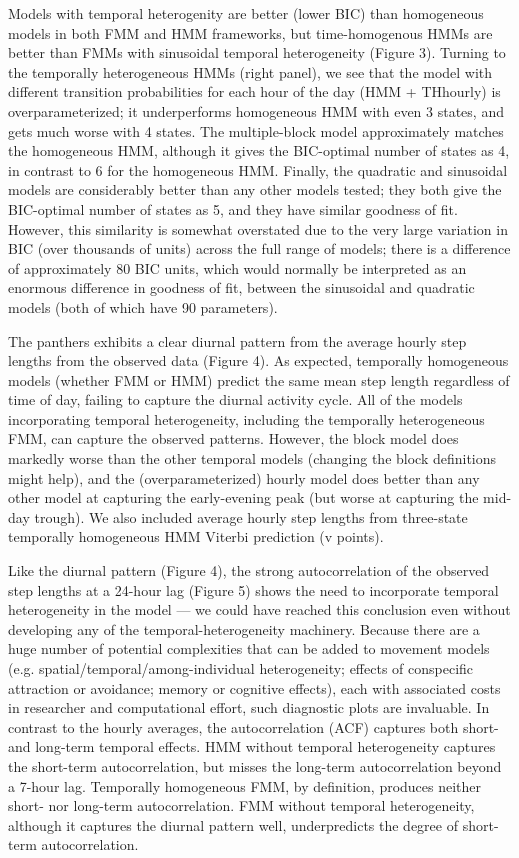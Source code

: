 \documentclass{bmcart}
\begin{document}

Models with temporal heterogenity are better (lower BIC) than homogeneous models in both FMM and HMM frameworks, but time-homogenous HMMs are better than FMMs with sinusoidal temporal heterogeneity (Figure 3). Turning to the temporally heterogeneous HMMs (right panel), we see that the model with different transition probabilities for each hour of the day (HMM + THhourly) is overparameterized; it underperforms homogeneous HMM with even 3 states, and gets much worse with 4 states. The multiple-block model approximately matches the homogeneous HMM, although it gives the BIC-optimal number of states as 4, in contrast to 6 for the homogeneous HMM.  Finally, the quadratic and sinusoidal models are considerably better than any other models tested; they both give the BIC-optimal number of states as 5, and they have similar goodness of fit.
However, this similarity is somewhat overstated due to the very large variation in BIC (over thousands of units) across the full range of models; there is a difference of approximately 80 BIC units, which would
normally be interpreted as an enormous difference in goodness of fit,
between the sinusoidal and quadratic models (both of which have 90 
parameters).



The panthers exhibits a clear diurnal pattern from the average hourly step lengths from the observed data (Figure 4). As expected, temporally homogeneous models (whether FMM or HMM) predict the same mean step length regardless of time of day, failing to capture the diurnal activity cycle. All of the models incorporating temporal heterogeneity, including the temporally heterogeneous FMM, can capture the observed patterns. However, the block model does markedly worse than the other temporal models (changing the block definitions might help), and the (overparameterized) hourly model does better than any other model at capturing the early-evening peak (but worse at capturing the mid-day trough). We also included average hourly step lengths from three-state temporally homogeneous HMM Viterbi prediction (v points).

Like the diurnal pattern (Figure 4),
the strong autocorrelation of the observed step lengths at a 24-hour lag (Figure 5) shows the need to incorporate temporal heterogeneity in the model --- we could have reached this conclusion even without developing any of the temporal-heterogeneity machinery.
Because there are a huge number of potential complexities that can be added to movement models (e.g. spatial/temporal/among-individual heterogeneity; effects of conspecific attraction or avoidance; memory or cognitive effects), each with associated costs in researcher and computational effort, such diagnostic plots are invaluable. In contrast to the hourly averages, the autocorrelation (ACF) captures both short- and long-term temporal effects. HMM without temporal heterogeneity captures the short-term autocorrelation, but misses the long-term autocorrelation beyond a 7-hour lag.
Temporally homogeneous FMM, by definition, produces neither short- nor long-term autocorrelation. FMM without temporal heterogeneity, although it captures the diurnal pattern well, underpredicts the degree of short-term autocorrelation.
\end{document}
